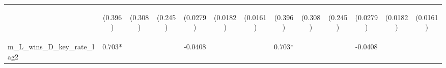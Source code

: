\documentclass[]{article}
\begin{document}
\begin{center}
\begin{tabular}{lcccccccccccc}
\vspace{4pt} & \begin{footnotesize}(0.396)\end{footnotesize} & \begin{footnotesize}(0.308)\end{footnotesize} & \begin{footnotesize}(0.245)\end{footnotesize} & \begin{footnotesize}(0.0279)\end{footnotesize} & \begin{footnotesize}(0.0182)\end{footnotesize} & \begin{footnotesize}(0.0161)\end{footnotesize} & \begin{footnotesize}(0.396)\end{footnotesize} & \begin{footnotesize}(0.308)\end{footnotesize} & \begin{footnotesize}(0.245)\end{footnotesize} & \begin{footnotesize}(0.0279)\end{footnotesize} & \begin{footnotesize}(0.0182)\end{footnotesize} & \begin{footnotesize}(0.0161)\end{footnotesize} \\
m\_L\_wins\_D\_key\_rate\_lag2 & 0.703* &  &  & -0.0408 &  &  & 0.703* &  &  & -0.0408 &  &  \\

\end{tabular}
\end{center}
\end{document}
